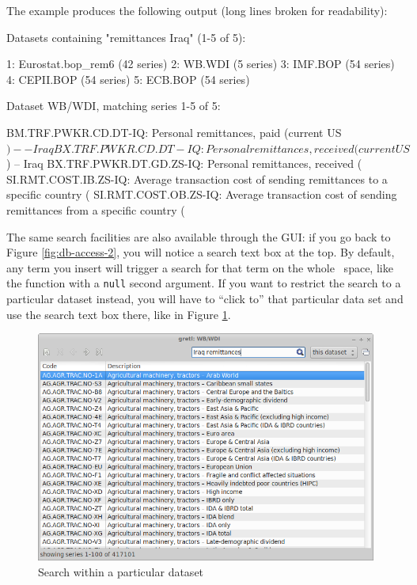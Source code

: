 \documentclass{article}
\begin{document}
The example produces the following output (long lines broken for
readability):

\begin{code}
Datasets containing "remittances Iraq" (1-5 of 5):

  1: Eurostat.bop_rem6 (42 series)
  2: WB.WDI (5 series)
  3: IMF.BOP (54 series)
  4: CEPII.BOP (54 series)
  5: ECB.BOP (54 series)

Dataset WB/WDI, matching series 1-5 of 5:

BM.TRF.PWKR.CD.DT-IQ: Personal remittances, paid (current US$) -- Iraq
BX.TRF.PWKR.CD.DT-IQ: Personal remittances, received (current US$) -- Iraq
BX.TRF.PWKR.DT.GD.ZS-IQ: Personal remittances, received (%
SI.RMT.COST.IB.ZS-IQ: Average transaction cost of sending remittances
  to a specific country (%
SI.RMT.COST.OB.ZS-IQ: Average transaction cost of sending remittances
  from a specific country (%
\end{code}

The same search facilities are also available through the GUI: if you
go back to Figure \ref{fig:db-access-2}, you will notice a search text
box at the top. By default, any term you insert will trigger a search
for that term on the whole \DB\ space, like the 
function with a \texttt{null} second argument. If you want to restrict
the search to a particular dataset instead, you will have to ``click
to'' that particular data set and use the search text box there, like
in Figure \ref{fig:db-access-3}.

\begin{figure}[htbp]
  \centering
  \includegraphics[scale=0.5]{db-access-3}
  \caption{Search within a particular dataset}
  \label{fig:db-access-3}
\end{figure}
\end{document}
